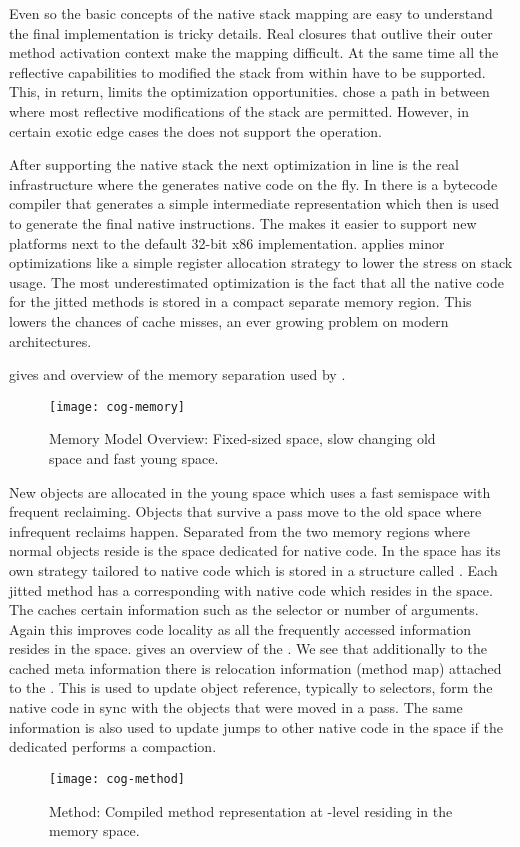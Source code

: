 Even so the basic concepts of the native stack mapping are easy to understand the final implementation is tricky details.
Real closures that outlive their outer method activation context make the mapping difficult.
At the same time all the reflective capabilities to modified the stack from within \PH have to be supported.
This, in return, limits the optimization opportunities.
\Cog chose a path in between where most reflective modifications of the stack are permitted.
However, in certain exotic edge cases the \VM does not support the operation.

After supporting the native stack the next optimization in line is the real \JIT infrastructure where the \VM generates native code on the fly.
In \Cog there is a bytecode compiler that generates a simple intermediate representation which then is used to generate the final native instructions.
The \IR makes it easier to support new platforms next to the default 32-bit x86 implementation.
\Cog applies minor optimizations like a simple register allocation strategy to lower the stress on stack usage.
The most underestimated optimization is the fact that all the native code for the jitted methods is stored in a compact separate memory region.
This lowers the chances of cache misses, an ever growing problem on modern \CPU architectures.

 gives and overview of the memory separation used by \Cog.
%
\begin{figure}[h]
	\centering
	\texttt{[image: cog-memory]}
	\caption[\Cog Memory Model Overview]{\Cog Memory Model Overview: Fixed-sized \JIT space, slow changing old space and fast young space.}
\end{figure}
%
New objects are allocated in the young space which uses a fast semispace \GC with frequent reclaiming.
Objects that survive a \GC pass move to the old space where infrequent reclaims happen.
Separated from the two memory regions where normal \PH objects reside is the \JIT space dedicated for native code.
In \Cog the \JIT space has its own \GC strategy tailored to native code which is stored in a structure called \CogMethod.
Each jitted \PH method has a corresponding \CogMethod with native code which resides in the \JIT space.
The \CogMethod caches certain information such as the selector or number of arguments.
Again this improves code locality as all the frequently accessed information resides in the \JIT space.
 gives an overview of the \CogMethod.
We see that additionally to the cached meta information there is relocation information (method map) attached to the \CogMethod.
This is used to update object reference, typically to selectors, form the native code in sync with the objects that were moved in a \GC pass.
The same information is also used to update jumps to other native code in the \JIT space if the dedicated \JIT \GC performs a compaction.
%
\begin{figure}[h]
	\centering
	\texttt{[image: cog-method]}
	\caption[\Cog Method]{\Cog Method: Compiled method representation at \JIT-level residing in the \JIT memory space.}
\end{figure}

